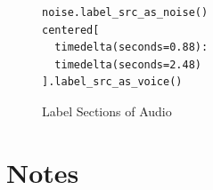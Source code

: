 \documentclass{article}
\begin{document}
\begin{multicols}{2}
\begin{figure}[H]
  \centering
  \begin{lstlisting}
noise.label_src_as_noise()
centered[
  timedelta(seconds=0.88):
  timedelta(seconds=2.48)
].label_src_as_voice()
\end{lstlisting}

  \caption{Label Sections of Audio}
  \label{fig:labeling}
\end{figure}


\section{Notes}

{}




\end{multicols}
\end{document}
